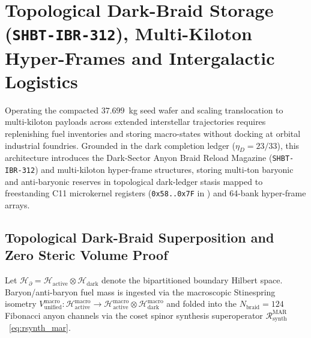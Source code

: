 \documentclass[11pt,onecolumn]{article}
\begin{document}
\FloatBarrier
\section[Topological Dark-Braid Storage, Multi-Kiloton Hyper-Frames and Intergalactic Logistics]{Topological Dark-Braid Storage (\texttt{SHBT-IBR-312}), Multi-Kiloton Hyper-Frames and Intergalactic Logistics}
\label{sec:ibr312}

Operating the compacted $37.699$~kg seed wafer and scaling translocation to multi-kiloton payloads across extended interstellar trajectories requires replenishing fuel inventories and storing macro-states without docking at orbital industrial foundries. Grounded in the dark completion ledger ($\eta_D = 23/33$), this architecture introduces the Dark-Sector Anyon Braid Reload Magazine (\texttt{SHBT-IBR-312}) and multi-kiloton hyper-frame structures, storing multi-ton baryonic and anti-baryonic reserves in topological dark-ledger stasis mapped to freestanding C11 microkernel registers (\texttt{0x58..0x7F} in ) and 64-bank hyper-frame arrays.

\FloatBarrier
\subsection{Topological Dark-Braid Superposition and Zero Steric Volume Proof}
\label{subsec:zero_volume_proof}
Let $\mathcal{H}_\partial = \mathcal{H}_{\mathrm{active}} \otimes \mathcal{H}_{\mathrm{dark}}$ denote the bipartitioned boundary Hilbert space. Baryon/anti-baryon fuel mass is ingested via the macroscopic Stinespring isometry $V_{\mathrm{unified}}^{\mathrm{macro}} : \mathcal{H}_{\mathrm{active}}^{\mathrm{macro}} \to \mathcal{H}_{\mathrm{active}}^{\mathrm{macro}} \otimes \mathcal{H}_{\mathrm{dark}}^{\mathrm{macro}}$ and folded into the $N_{\mathrm{braid}} = 124$ Fibonacci anyon channels via the coset spinor synthesis superoperator $\mathcal{R}_{\mathrm{synth}}^{\mathrm{MAR}}$~\eqref{eq:rsynth_mar}.
\end{document}
